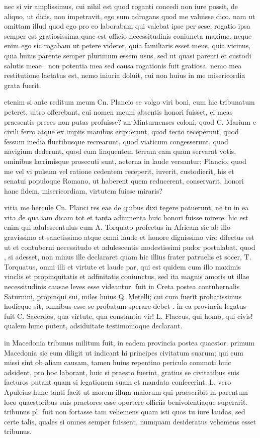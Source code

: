  nec si vir amplissimus, cui nihil est quod roganti concedi non iure possit, de aliquo, ut dicis, non impetravit, ego sum adrogans quod me valuisse dico. nam ut omittam illud quod ego pro eo laborabam qui valebat ipse per sese, rogatio ipsa semper est gratiosissima quae est officio necessitudinis coniuncta maxime. neque enim ego sic rogabam ut petere viderer, quia familiaris esset meus, quia vicinus, quia huius parente semper plurimum essem usus, sed ut quasi parenti et custodi salutis meae . non potentia mea sed causa rogationis fuit gratiosa. nemo mea restitutione laetatus est, nemo iniuria doluit, cui non huius in me misericordia grata fuerit.

 etenim si ante reditum meum Cn. Plancio se volgo viri boni, cum hic tribunatum peteret, ultro offerebant, cui nomen meum absentis honori fuisset, ei meas praesentis preces non putas profuisse? an Minturnenses coloni, quod C. Marium e civili ferro atque ex impiis manibus eripuerunt, quod tecto receperunt, quod fessum inedia fluctibusque recrearunt, quod viaticum congesserunt, quod navigium dederunt, quod eum linquentem terram eam quam servarat votis, ominibus lacrimisque prosecuti sunt, aeterna in laude versantur; Plancio, quod me vel vi pulsum vel ratione cedentem receperit, iuverit, custodierit, his et senatui populoque Romano, ut haberent quem reducerent, conservarit, honori hanc fidem, misericordiam, virtutem fuisse miraris?

 vitia me hercule Cn. Planci res eae de quibus dixi tegere potuerunt, ne tu in ea vita de qua iam dicam tot et tanta adiumenta huic honori fuisse mirere. hic est enim qui adulescentulus cum A. Torquato profectus in Africam sic ab illo gravissimo et sanctissimo atque omni laude et honore dignissimo viro dilectus est ut et contuberni necessitudo et adulescentis modestissimi pudor postulabat, quod , si adesset, non minus ille declararet quam hic illius frater patruelis et socer, T. Torquatus, omni illi et virtute et laude par, qui est quidem cum illo maximis vinclis et propinquitatis et adfinitatis coniunctus, sed ita magnis amoris ut illae necessitudinis causae leves esse videantur. fuit in Creta postea contubernalis Saturnini, propinqui sui, miles huius Q. Metelli; cui cum fuerit probatissimus hodieque sit, omnibus esse se probatum sperare debet . in ea provincia legatus fuit C. Sacerdos, qua virtute, qua constantia vir! L. Flaccus, qui homo, qui civis! qualem hunc putent, adsiduitate testimonioque declarant.

 in Macedonia tribunus militum fuit, in eadem provincia postea quaestor. primum Macedonia sic eum diligit ut indicant hi principes civitatum suarum; qui cum missi sint ob aliam causam, tamen huius repentino periculo commoti huic adsident, pro hoc laborant, huic si praesto fuerint, gratius se civitatibus suis facturos putant quam si legationem suam et mandata confecerint. L. vero Apuleius hunc tanti facit ut morem illum maiorum qui praescribit in parentum loco quaestoribus suis praetores esse oportere officiis benivolentiaque superarit. tribunus pl. fuit non fortasse tam vehemens quam isti quos tu iure laudas, sed certe talis, quales si omnes semper fuissent, numquam desideratus vehemens esset tribunus.

